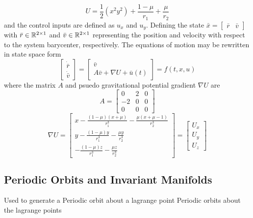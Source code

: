 \documentclass[letterpaper, preprint, paper,11pt]{AAS}	%
\begin{document}
\begin{equation}
	U = \frac{1}{2} \left( x^2 y^2\right) + \frac{1-\mu}{r_1} + \frac{\mu}{r_2}
	\label{eq:eff_pot}
\end{equation}
and the control inputs are defined as \( u_x\) and \(u_y\).
Defining the state \( \bar{x} = \begin{bmatrix}\bar{r} &\bar{v} \end{bmatrix}\) with \(\bar{r} \in \mathbb{R}^{2\times1}\) and \(\bar{v} \in \mathbb{R}^{2\times1}\) representing the position and velocity with respect to the system barycenter, respectively.
The equations of motion may be rewritten in state space form
\begin{equation}
	\left[\begin{array}{c} \dot{\bar{r}} \\ \dot{\bar{v}} \end{array} \right] = 
	\left[ \begin{array}{c} \bar{v} \\ A \bar{v} + \nabla U + \bar{u}(t) \end{array} \right] = f\left( t,x, u\right)
\end{equation}
where the matrix \( A \) and psuedo gravitational potential gradient \( \nabla U\) are
\begin{equation}\label{eq:A_mat}
	A = \left[ \begin{array}{ccc} 0 & 2 & 0 \\ -2 & 0 & 0 \\ 0 & 0 & 0 \end{array} \right]
\end{equation}
\begin{equation} \label{eq:grav_pot}
	\nabla U = \left[ \begin{array}{c} x - \frac{ \left(1 - \mu\right) \left(x + \mu\right)}{r_1^3} - \frac{\mu \left( x+ \mu -1\right)}{r_2^3} \\
											y - \frac{ \left(1 - \mu\right) y}{r_1^3} - \frac{\mu y}{r_2^3} \\
											- \frac{ \left(1 - \mu\right) z}{r_1^3} - \frac{\mu z}{r_2^3}\end{array}\right]
					= \left[\begin{array}{c} U_x \\ U_y \\ U_z\end{array} \right]
\end{equation}
\subsection{Periodic Orbits and Invariant Manifolds}
Used to generate a Periodic orbit about a lagrange point
Periodic orbits about the lagrange points
\end{document}
